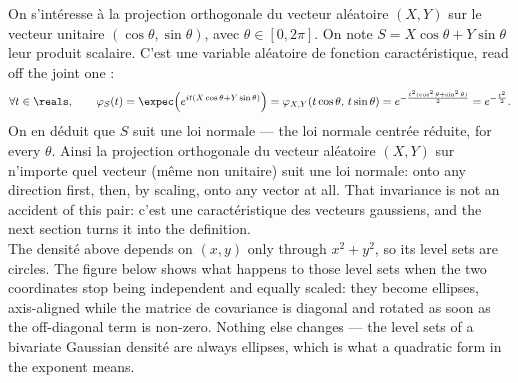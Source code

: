 On s'intéresse à la projection orthogonale du vecteur aléatoire $(X,Y)$ sur le
vecteur unitaire $(\cos\theta,\sin\theta)$, avec $\theta \in [0,2\pi]$. On note
$S = X\cos\theta + Y\sin\theta$ leur produit scalaire. C'est une variable
aléatoire de fonction caractéristique, read off the joint one :
\[
  \forall t \in \reals, \qquad
  \varphi_{S}(t) = \expec\!\left(e^{it(X\cos\theta + Y\sin\theta)}\right)
                 = \varphi_{X,Y}(t\cos\theta,\, t\sin\theta)
                 = e^{-\frac{t^{2}(\cos^{2}\theta + \sin^{2}\theta)}{2}}
                 = e^{-\frac{t^{2}}{2}} .
\]
On en déduit que $S$ suit une loi normale --- the loi normale centrée réduite,
for every $\theta$. Ainsi la projection orthogonale du vecteur aléatoire $(X,Y)$
sur n'importe quel vecteur (même non unitaire) suit une loi normale: onto any
direction first, then, by scaling, onto any vector at all. That invariance is not
an accident of this pair: c'est une caractéristique des vecteurs gaussiens, and
the next section turns it into the definition.\\

The densité above depends on $(x,y)$ only through $x^{2}+y^{2}$, so its level
sets are circles. The figure below shows what happens to those level sets when
the two coordinates stop being independent and equally scaled: they become
ellipses, axis-aligned while the matrice de covariance is diagonal and rotated as
soon as the off-diagonal term is non-zero. Nothing else changes --- the level
sets of a bivariate Gaussian densité are always ellipses, which is what a
quadratic form in the exponent means.

